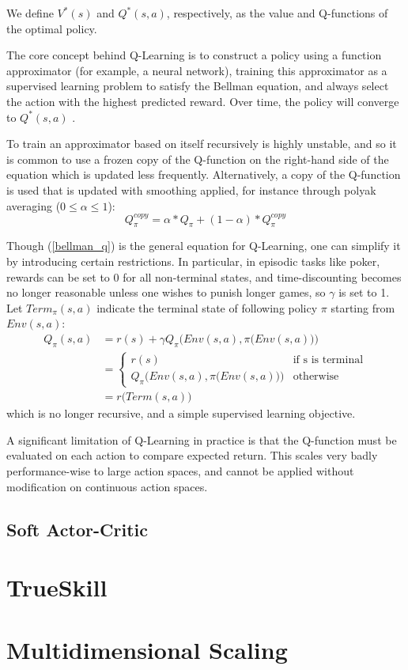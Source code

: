 We define $V^*(s)$ and $Q^*(s, a)$, respectively, as the value and Q-functions of the optimal policy.

The core concept behind Q-Learning is to construct a policy using a function approximator (for example, a neural network), training this approximator as a supervised learning problem to satisfy the Bellman equation, and always select the action with the highest predicted reward.
Over time, the policy will converge to $Q^*(s, a)$ \cite{Qlearn_convergence}.

To train an approximator based on itself recursively is highly unstable, and so it is common to use a frozen copy of the Q-function on the right-hand side of the equation which is updated less frequently. Alternatively, a copy of the Q-function is used that is updated with smoothing applied, for instance through polyak averaging ($0 \leq \alpha \leq 1$):
\begin{equation}
    Q_{\pi}^{copy} = \alpha * Q_{\pi} + (1 - \alpha) * Q_{\pi}^{copy}
\end{equation}

Though (\ref{bellman_q}) is the general equation for Q-Learning, one can simplify it by introducing certain restrictions. In particular, in episodic tasks like poker, rewards can be set to 0 for all non-terminal states, and time-discounting becomes no longer reasonable unless one wishes to punish longer games, so $\gamma$ is set to 1. Let $Term_{\pi}(s, a)$ indicate the terminal state of following policy $\pi$ starting from $Env(s, a)$:
\begin{equation}
\begin{split}
Q_{\pi}(s, a) &= r(s) + \gamma Q_{\pi}\Big(Env(s, a), \pi\big(Env(s, a)\big)\Big)\\
&= \begin{cases}
r(s) &\mbox{if s is terminal} \\
Q_{\pi}\Big(Env(s, a), \pi\big(Env(s, a)\big)\Big) &\mbox{otherwise}
\end{cases}\\
&= r\big(Term(s, a)\big)
\end{split}
\end{equation}
which is no longer recursive, and a simple supervised learning objective.

A significant limitation of Q-Learning in practice is that the Q-function must be evaluated on each action to compare expected return. This scales very badly performance-wise to large action spaces, and cannot be applied without modification on continuous action spaces.



\subsection{Soft Actor-Critic}


\section{TrueSkill}


\section{Multidimensional Scaling}
